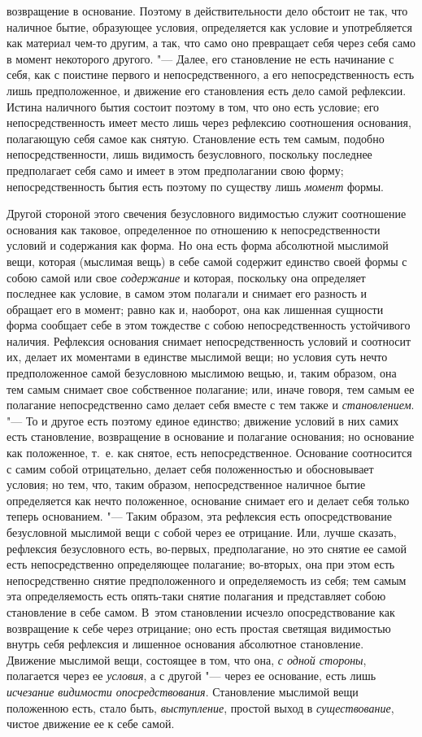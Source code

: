 возвращение в основание. Поэтому в действительности дело обстоит не так,
что наличное бытие, образующее условия, определяется как условие и
употребляется как материал чем-то другим, а так, что само оно превращает
себя через себя само в момент некоторого другого. "--- Далее, его становление
не есть начинание с себя, как с поистине первого и непосредственного, а его
непосредственность есть лишь предположенное, и движение его становления
есть дело самой рефлексии. Истина наличного бытия состоит поэтому в том,
что оно есть условие; его непосредственность имеет место лишь через
рефлексию соотношения основания, полагающую себя самое как снятую.
Становление есть тем самым, подобно непосредственности, лишь видимость
безусловного, поскольку последнее предполагает себя само и имеет в этом
предполагании свою форму; непосредственность бытия есть поэтому по существу
лишь {\em момент} формы.

Другой стороной этого свечения безусловного видимостью служит соотношение
основания как таковое, определенное по отношению к непосредственности
условий и содержания как форма. Но она есть форма абсолютной мыслимой вещи,
которая (мыслимая вещь) в себе самой содержит единство своей формы с собою
самой или свое {\em содержание} и которая, поскольку
она определяет последнее как условие, в самом этом полагали и снимает его
разность и обращает его в момент; равно как и, наоборот, она как лишенная
сущности форма сообщает себе в этом тождестве с собою непосредственность
устойчивого наличия. Рефлексия основания снимает непосредственность условий
и соотносит их, делает их моментами в единстве мыслимой вещи; но условия
суть нечто предположенное самой безусловною мыслимою вещью, и, таким
образом, она тем самым снимает свое собственное полагание; или, иначе
говоря, тем самым ее полагание непосредственно само делает себя вместе с
тем также и {\em становлением}. "--- То и другое есть
поэтому единое единство; движение условий в них самих есть становление,
возвращение в основание и полагание основания; но основание как положенное,
т.~е. как снятое, есть непосредственное. Основание соотносится с самим
собой отрицательно, делает себя положенностью и обосновывает условия; но
тем, что, таким образом, непосредственное наличное бытие определяется как
нечто положенное, основание снимает его и делает себя только теперь
основанием. "--- Таким образом, эта рефлексия есть опосредствование
безусловной мыслимой вещи с собой через ее отрицание. Или, лучше сказать,
рефлексия безусловного есть, во-первых, предполагание, но это снятие ее
самой есть непосредственно определяющее полагание; во-вторых, она при этом
есть непосредственно снятие предположенного и определяемость из себя; тем
самым эта определяемость есть опять-таки снятие полагания и представляет
собою становление в себе самом. В~этом становлении исчезло опосредствование
как возвращение к себе через отрицание; оно есть простая светящая
видимостью внутрь себя рефлексия и лишенное основания абсолютное
становление. Движение мыслимой вещи, состоящее в том, что она,
{\em с одной стороны}, полагается через ее
{\em условия}, а с другой "--- через ее основание, есть
лишь {\em исчезание видимости опосредствования}.
Становление мыслимой вещи положенною есть, стало быть,
{\em выступление}, простой выход в
{\em существование}, чистое движение ее к себе самой.

